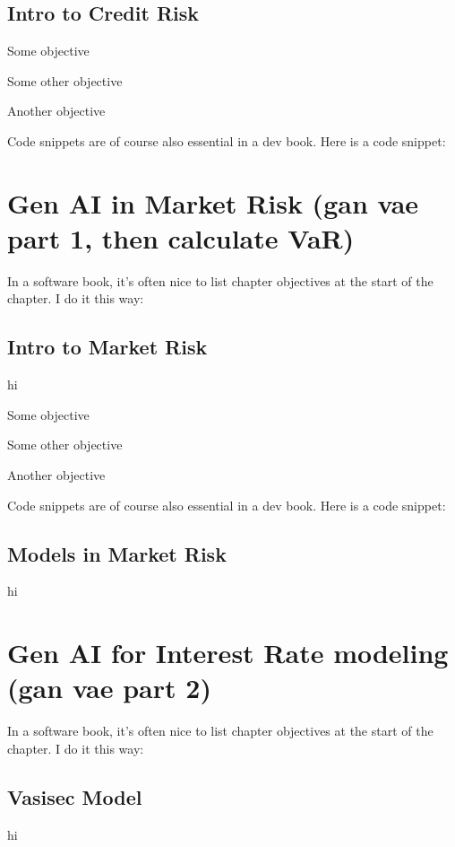 \documentclass[a4paper,headinclude=on,footinclude=on,12pt,oneside]{scrbook}
\begin{document}
\section{Intro to Credit Risk}
\begin{arrows}
	\item Some objective
	\item Some other objective
	\item Another objective
\end{arrows}


Code snippets are of course also essential in a dev book. Here is a code snippet:


\chapter{Gen AI in Market Risk (gan vae part 1, then calculate VaR)}
In a software book, it's often nice to list chapter objectives at the start of the chapter. I do it this way:

\section{Intro to Market Risk}
hi
\begin{arrows}
	\item Some objective
	\item Some other objective
	\item Another objective
\end{arrows}


Code snippets are of course also essential in a dev book. Here is a code snippet:


\section{Models in Market Risk }
hi

\chapter{Gen AI for Interest Rate modeling (gan vae part 2)}
In a software book, it's often nice to list chapter objectives at the start of the chapter. I do it this way:
\section{Vasisec Model}
hi
\end{document}
